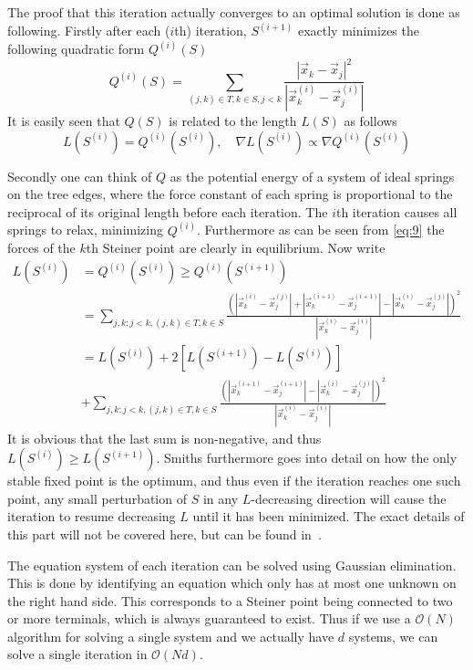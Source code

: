 The proof that this iteration actually converges to an optimal solution is done
as following.  Firstly after each ($i$th) iteration, $S^{(i+1)}$ exactly
minimizes the following quadratic form $Q^{(i)}(S)$
%
\begin{equation}
  \label{eq:7}
  Q^{(i)}(S) = \sum_{(j,k) \in T, k \in S, j < k } \frac{|\vec x_k - \vec x_j|^2}{|\vec x^{(i)}_k - \vec x^{(i)}_j|}
\end{equation}
%
It is easily seen that $Q(S)$ is related to the length $L(S)$ as follows
%
\begin{equation}
  \label{eq:8}
  L(S^{(i)}) = Q^{(i)}(S^{(i)}), \quad \nabla L(S^{(i)}) \propto \nabla Q^{(i)}(S^{(i)})
\end{equation}

Secondly one can think of $Q$ as the potential energy of a system of ideal
springs on the tree edges, where the force constant of each spring is
proportional to the reciprocal of its original length before each iteration.  The
$i$th iteration causes all springs to relax, minimizing $Q^{(i)}$.  Furthermore
as can be seen from \cref{eq:9} the forces of the $k$th Steiner point are
clearly in equilibrium.  Now write
%
\begin{align}
  \label{eq:10}
  L(S^{(i)}) &= Q^{(i)}(S^{(i)}) \ge Q^{(i)}(S^{(i+1)}) \\
             &= \sum_{j, k : j < k, (j,k) \in T, k \in S} \frac{{(
               |\vec x_k^{(i)} - \vec x_j^{(j)}| + |\vec x_k^{(i+1)} -
               \vec x_j^{(i+1)}| - |\vec x_k^{(i)} - \vec x_j^{(j)}|)}^2}{
               |\vec x_k^{(i)} - \vec x_j^{(i)}|} \\
             &= L(S^{(i)}) + 2 [ L(S^{(i+1)}) - L(S^{(i)})] \nonumber \\
             &+ \sum_{j, k : j < k, (j,k) \in T, k \in S} \frac{{(
               |\vec x_k^{(i+1)} -
               \vec x_j^{(i+1)}| - |\vec x_k^{(i)} - \vec x_j^{(j)}|)}^2}{
               |\vec x_k^{(i)} - \vec x_j^{(i)}|}
\end{align}
%
It is obvious that the last sum is non-negative, and thus
$L(S^{(i)}) \ge L(S^{(i+1)})$.  Smiths furthermore goes into detail on how the
only stable fixed point is the optimum, and thus even if the iteration reaches
one such point, any small perturbation of $S$ in any $L$-decreasing direction
will cause the iteration to resume decreasing $L$ until it has been
minimized. The exact details of this part will not be covered here, but can be
found in~\cite[p.~147--148]{Smith1992}.

The equation system of each iteration can be solved using Gaussian elimination.
This is done by identifying an equation which only has at most one unknown on the right
hand side.  This corresponds to a Steiner point being connected to two or more
terminals, which is always guaranteed to exist.  Thus if we use a $\mathcal
O(N)$ algorithm for solving a single system and we actually have $d$ systems, we
can solve a single iteration in $\mathcal O(Nd)$.

